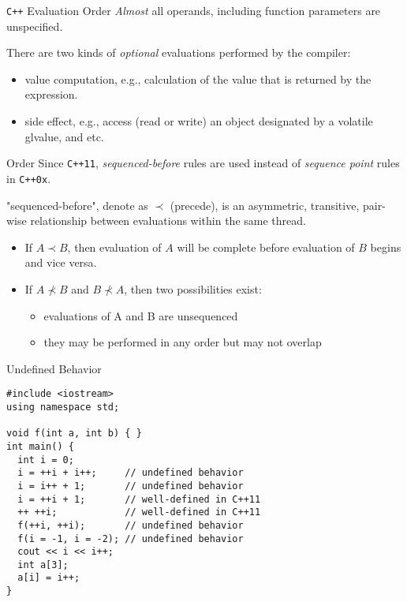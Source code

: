 \documentclass[presentation]{beamer}
\begin{document}
\begin{frame}[fragile,label={sec:orgheadline13}]{\texttt{C++} Evaluation Order}
 \emph{Almost} all operands, including function parameters are
\alert{unspecified}.

There are two kinds of \emph{optional} evaluations performed by the
compiler:

\begin{itemize}
\item value computation, e.g., calculation of the value that is
returned by the expression.
\item side effect, e.g., access (read or write) an object designated by
a volatile glvalue, and etc.
\end{itemize}
\end{frame}

\begin{frame}[fragile,label={sec:orgheadline14}]{Order}
 Since \texttt{C++11}, \emph{sequenced-before} rules are used instead of
\emph{sequence point} rules in \texttt{C++0x}.

"sequenced-before", denote as \(\prec\) (precede), is an
asymmetric, transitive, pair-wise relationship between evaluations
within the same thread.

\begin{itemize}
\item If \(A\prec B\), then evaluation of \(A\) will be complete before
evaluation of \(B\) begins and vice versa.
\item If \(A\nprec B\) and \(B\nprec A\), then two possibilities exist:
\begin{itemize}
\item evaluations of A and B are unsequenced
\item they may be performed in any order but may not overlap
\end{itemize}
\end{itemize}
\end{frame}

\begin{frame}[fragile,label={sec:orgheadline15}]{Undefined Behavior}
 \begin{verbatim}
#include <iostream>
using namespace std;

void f(int a, int b) { }
int main() {
  int i = 0;
  i = ++i + i++;     // undefined behavior
  i = i++ + 1;       // undefined behavior
  i = ++i + 1;       // well-defined in C++11
  ++ ++i;            // well-defined in C++11
  f(++i, ++i);       // undefined behavior
  f(i = -1, i = -2); // undefined behavior
  cout << i << i++;
  int a[3];
  a[i] = i++;
}
\end{verbatim}
\end{frame}
\end{document}
